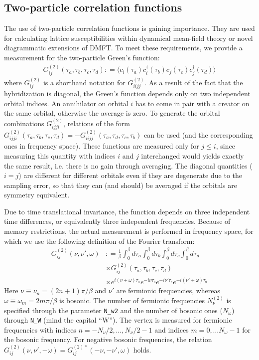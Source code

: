 \documentclass[aps,prb,floatfix,superscriptaddress,twocolumn,notitlepage]{revtex4-1}
\newcommand\Let{\mathrel{\mathop:\!\!=}}
\begin{document}
\subsection{Two-particle correlation functions}
\label{2particle}

The use of two-particle correlation functions is gaining importance. They are used for calculating lattice susceptibilities within dynamical mean-field theory or novel diagrammatic extensions of DMFT.
To meet these requirements, we provide a measurement for the two-particle Green's function:
\begin{align}
G^{(2)}_{ij}(\tau_{a},\tau_{b},\tau_{c},\tau_{d}) \Let \langle c_{i}(\tau_{a})c^{\dagger}_{i}(\tau_{b})c_{j}(\tau_{c})c^{\dagger}_{j}(\tau_{d})\rangle
\end{align}
where $G^{(2)}_{ij}$ is a shorthand notation for $G^{(2)}_{iijj}$. As a result of the fact that the hybridization is diagonal, the Green's function depends only on two independent orbital indices. An annihilator on orbital $i$ has to come in pair with a creator on the same orbital, otherwise the average is zero. To generate the orbital combinations $G^{(2)}_{ijji}$, relations of the form $G^{(2)}_{ijji}(\tau_{a},\tau_{b},\tau_{c},\tau_{d}) = -G^{(2)}_{iijj}(\tau_{a},\tau_{d},\tau_{c},\tau_{b})$ can be used (and the corresponding ones in frequency space).
These functions are measured only for $j\leq i$, since measuring this quantity with indices $i$ and $j$ interchanged would yields exactly the same result, i.e. there is no gain through averaging. The diagonal quantities ($i=j$) are different for different orbitals even if they are degenerate due to the sampling error, so that they can (and should) be averaged if the orbitals are symmetry equivalent.

Due to time translational invariance, the function depends on three independent time differences, or equivalently three independent frequencies. Because of memory restrictions, the actual measurement is performed in frequency space, for which we use the following definition of the Fourier transform:
\begin{align}
G^{(2)}_{ij}(\nu,\nu',\omega) &\Let \frac{1}{\beta}\int_{0}^{\beta}d\tau_{a}\int_{0}^{\beta} d\tau_{b}\int_{0}^{\beta} d\tau_{c}\int_{0}^{\beta} d\tau_{d}\, \\ \nonumber &\times G^{(2)}_{ij}(\tau_{a},\tau_{b},\tau_{c},\tau_{d}) \\ \nonumber &\times e^{i(\nu+\omega)\tau_{a}}e^{-i\nu\tau_{b}}e^{-i\nu'\tau_{c}}e^{-i(\nu'+\omega)\tau_{a}}
\end{align}
Here $\nu\equiv\nu_{n}=(2n+1)\pi/\beta$ and $\nu'$ are fermionic frequencies, whereas $\omega\equiv\omega_{m}=2m\pi/\beta$ is bosonic.
The number of fermionic frequencies $N^{(2)}_{\nu}$ is specified through the parameter \verb#N_w2# and the number of bosonic ones ($N_{\omega}$) through \verb#N_W# (mind the capital ``W'').
The vertex is measured for fermionic frequencies with indices $n=-N_{\nu}/2,\ldots,N_{\nu}/2-1$ and indices $m=0,\ldots N_{\omega}-1$ for the bosonic frequency. For negative bosonic frequencies, the relation $G^{(2)}_{ij}(\nu,\nu',-\omega)=G^{(2)*}_{ij}(-\nu,-\nu',\omega)$ holds.
\end{document}
